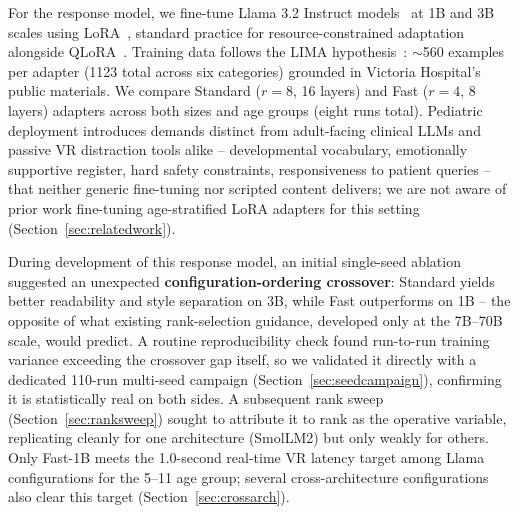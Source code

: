 \documentclass[pdflatex,sn-mathphys-num]{sn-jnl}%
\begin{document}
For the response model, we fine-tune Llama 3.2 Instruct models~\cite{dubey2024llama3} at 1B and 3B scales using LoRA~\cite{hu2022lora}, standard practice for resource-constrained adaptation alongside QLoRA~\cite{dettmers2023qlora}. Training data follows the LIMA hypothesis~\cite{zhou2023lima}: $\sim$560 examples per adapter (1123 total across six categories) grounded in Victoria Hospital's public materials. We compare Standard ($r=8$, 16 layers) and Fast ($r=4$, 8 layers) adapters across both sizes and age groups (eight runs total). Pediatric deployment introduces demands distinct from adult-facing clinical LLMs and passive VR distraction tools alike -- developmental vocabulary, emotionally supportive register, hard safety constraints, responsiveness to patient queries -- that neither generic fine-tuning nor scripted content delivers; we are not aware of prior work fine-tuning age-stratified LoRA adapters for this setting (Section~\ref{sec:relatedwork}).

During development of this response model, an initial single-seed ablation suggested an unexpected \textbf{configuration-ordering crossover}: Standard yields better readability and style separation on 3B, while Fast outperforms on 1B -- the opposite of what existing rank-selection guidance, developed only at the 7B--70B scale, would predict. A routine reproducibility check found run-to-run training variance exceeding the crossover gap itself, so we validated it directly with a dedicated 110-run multi-seed campaign (Section~\ref{sec:seedcampaign}), confirming it is statistically real on both sides. A subsequent rank sweep (Section~\ref{sec:ranksweep}) sought to attribute it to rank as the operative variable, replicating cleanly for one architecture (SmolLM2) but only weakly for others. Only Fast-1B meets the 1.0-second real-time VR latency target among Llama configurations for the 5--11 age group; several cross-architecture configurations also clear this target (Section~\ref{sec:crossarch}).
\end{document}
